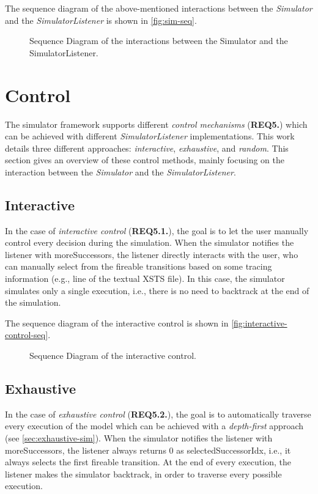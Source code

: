 The sequence diagram of the above-mentioned interactions between the \textit{Simulator} and the \textit{SimulatorListener} is shown in \autoref{fig:sim-seq}.

\begin{figure}[htbp]
	\centering
	
	\caption{Sequence Diagram of the interactions between the Simulator and the SimulatorListener.}
	\label{fig:sim-seq}
\end{figure}

\section{Control}

The simulator framework supports different \textit{control mechanisms} (\textbf{REQ5.}) which can be achieved with different \textit{SimulatorListener} implementations. This work details three different approaches: \textit{interactive}, \textit{exhaustive}, and \textit{random}. This section gives an overview of these control methods, mainly focusing on the interaction between the \textit{Simulator} and the \textit{SimulatorListener}.

\subsection{Interactive}
In the case of \textit{interactive control} (\textbf{REQ5.1.}), the goal is to let the user manually control every decision during the simulation. When the simulator notifies the listener with \textsf{moreSuccessors}, the listener directly interacts with the user, who can manually select from the fireable transitions based on some tracing information (e.g., line of the textual XSTS file). In this case, the simulator simulates only a single execution, i.e., there is no need to backtrack at the end of the simulation.

The sequence diagram of the interactive control is shown in \autoref{fig:interactive-control-seq}.

\begin{figure}[ht]
	\centering
	
	\caption{Sequence Diagram of the interactive control.}
	\label{fig:interactive-control-seq}
\end{figure}

\subsection{Exhaustive}
In the case of \textit{exhaustive control} (\textbf{REQ5.2.}), the goal is to automatically traverse every execution of the model which can be achieved with a \textit{depth-first} approach (see \autoref{sec:exhaustive-sim}). When the simulator notifies the listener with \textsf{moreSuccessors}, the listener always returns 0 as \textsf{selectedSuccessorIdx}, i.e., it always selects the first fireable transition. At the end of every execution, the listener makes the simulator backtrack, in order to traverse every possible execution.

